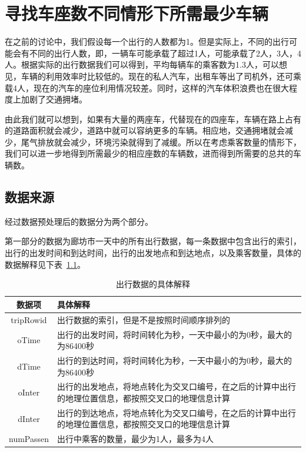 \chapter{寻找车座数不同情形下所需最少车辆}
\label{chap:num}

在之前的讨论中，我们假设每一个出行的人数都为1。但是实际上，不同的出行可能会有不同的出行人数，即，一辆车可能承载了超过1人，可能承载了2人，3人，4人。根据实际的出行数据我们可以得到，平均每辆车的乘客数为1.3人，可以想见，车辆的利用效率时比较低的。现在的私人汽车，出租车等出了司机外，还可乘载4人，现在的汽车的座位利用情况较差。同时，这样的汽车体积浪费也在很大程度上加剧了交通拥堵。
\par
由此我们就可以想到，如果有大量的两座车，代替现在的四座车，车辆在路上占有的道路面积就会减少，道路中就可以容纳更多的车辆。相应地，交通拥堵就会减少，尾气排放就会减少，环境污染就得到了减缓。所以在考虑乘客数量的情形下，我们可以进一步地得到所需最少的相应座数的车辆数，进而得到所需要的总共的车辆数。

\section{数据来源}
经过数据预处理后的数据分为两个部分。
\par
第一部分的数据为廊坊市一天中的所有出行数据，每一条数据中包含出行的索引，出行的出发时间和到达时间，出行的出发地点和到达地点，以及乘客数量，具体的数据解释见下表~\ref{tab:triplist}。
\begin{table}
    \centering
    \caption{出行数据的具体解释}
    \label{tab:triplist}
  \begin{tabular}{|c|p{10cm}|}
    \hline
    数据项 & 具体解释\\
    \hline \hline 
    tripRowid & 出行数据的索引，但是不是按照时间顺序排列的\\
    \hline 
    oTime & 出行的出发时间，将时间转化为秒，一天中最小的为0秒，最大的为86400秒\\
    \hline 
    dTime & 出行的到达时间，将时间转化为秒，一天中最小的为0秒，最大的为86400秒\\
    \hline 
    oInter & 出行的出发地点，将地点转化为交叉口编号，在之后的计算中出行的地理位置信息，都按照交叉口的地理信息计算\\
    \hline 
    dInter & 出行的到达地点，将地点转化为交叉口编号，在之后的计算中出行的地理位置信息，都按照交叉口的地理信息计算\\
    \hline 
    numPassen & 出行中乘客的数量，最少为1人，最多为4人\\
    \hline 
  \end{tabular}
\end{table}

